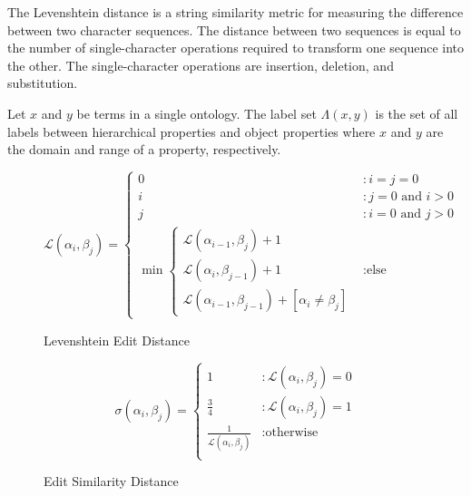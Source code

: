 \documentclass[letterpaper,twocolumn,12pt]{article}
\begin{document}
The Levenshtein distance is a string similarity metric for measuring the difference 
between two character sequences. 
The distance between two sequences is equal to the number of single-character 
operations required to transform one sequence into the other. 
The single-character operations are insertion, deletion, and substitution.

\begin{defn}
Let $x$ and $y$ be terms in a single ontology. The label set $\Lambda \left( x, y \right)$ is the set of all labels between hierarchical properties and object properties where $x$ and $y$ are the domain and range of a property, respectively.
\end{defn}

\begin{figure*}
\centering
\begin{equation*}
\mathcal{L} 
\left( \alpha_i, \beta_j \right) = \left\{
	\begin{array}{ll}
   	 	0 &: i=j=0 \\
		i &: j = 0 \text{ and } i > 0 \\
		j &: i = 0 \text{ and } j > 0 \\
		\min 
			\left\{ 
			\begin{array}{l}
				\mathcal{L} \left( \alpha_{i-1}, \beta_j \right) + 1 \\
          		        \mathcal{L} \left( \alpha_i, \beta_{j-1} \right) + 1 \\
          		        \mathcal{L} \left( \alpha_{i-1}, \beta_{j-1} \right) + [\alpha_i \neq \beta_j]
			\end{array} \right. &: \text{else}
     \end{array}
\right.
\end{equation*}
\caption{Levenshtein Edit Distance}
\end{figure*}

\begin{figure*}
\centering
\begin{equation*}
\sigma
\left( \alpha_i, \beta_j \right) = \left\{
\begin{array}{ll}
  1           &: \mathcal{L} \left( \alpha_i, \beta_j \right) = 0 \\
  \frac{3}{4} &: \mathcal{L} \left( \alpha_i, \beta_j \right) = 1 \\
  \frac{1}{\mathcal{L} \left( \alpha_i, \beta_j \right)} &: \text{otherwise} \\
\end{array}
\right.
\end{equation*}
\caption{Edit Similarity Distance}
\end{figure*}
\end{document}
